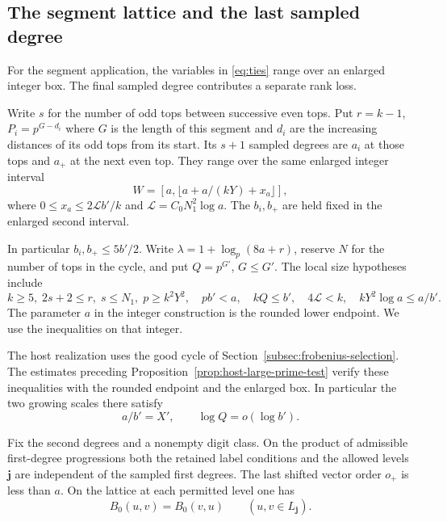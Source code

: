\subsection{The segment lattice and the last sampled degree}
\label{sec:segment-window}
\hypertarget{source-segment-window}{}

For the segment application, the variables in \eqref{eq:ties} range over an enlarged integer box. The final sampled degree contributes a separate rank loss.
\begin{paramdefinition}\label{hyp:segment-sampling}
Write \(s\) for the number of odd tops
between successive even tops. Put \(r=k-1\), \(P_i=p^{G-d_i}\)
where \(G\) is the length of this segment and \(d_i\) are the
increasing distances of its odd tops from its start. Its \(s+1\)
sampled degrees are \(a_i\) at those tops and \(a_+\) at the next
even top. They range over the same enlarged integer interval
\[
 W=[a,\lfloor a+a/(kY)+x_a\rfloor],
\]
where
\(0\le x_a\le2\mathcal L b'/k\) and
\(\mathcal L=C_0N_1^2\log a\). The \(b_i,b_+\) are held fixed
in the enlarged second interval.

In particular \(b_i,b_+\le5b'/2\).
Write \(\lambda=1+\log_p(8a+r)\), reserve \(N\) for the number of
tops in the cycle, and put \(Q=p^{G'}\), \(G\le G'\).
The local size hypotheses include
\[
 k\ge5,\; 2s+2\le r,\; s\le N_1,\;
 p\ge k^2Y^2,\quad pb'<a,\quad kQ\le b',\quad
 4\mathcal L<k,\quad kY^2\log a\le a/b'.
\]
The parameter \(a\) in the integer construction is the rounded
lower endpoint. We use the inequalities on that integer.
\end{paramdefinition}
The host realization uses the good cycle of Section~\ref{subsec:frobenius-selection}. The estimates preceding Proposition~\ref{prop:host-large-prime-test} verify these inequalities with the rounded endpoint and the enlarged box. In particular the two growing scales there satisfy
\[
        a/b'=X',\qquad \log Q=o(\log b').
\]


\begin{lemma}\label{lem:segment-common-digit-lattice}
Fix the second degrees and a nonempty digit class. On the
product of admissible first-degree progressions both the
retained label conditions and the allowed levels
\(\mathbf j\) are independent of the sampled first degrees.
The last shifted vector order \(o_+\) is less than \(a\).
On the lattice at each permitted level one has
\[
 B_0(u,v)=B_0(v,u)\qquad(u,v\in L_{\mathbf j}).
\]

\end{lemma}

